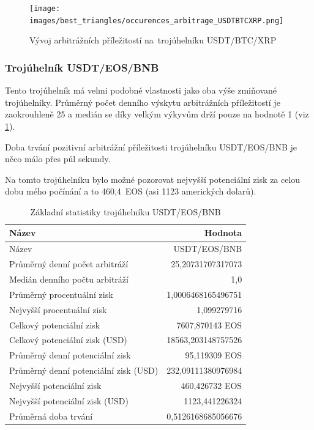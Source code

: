 \documentclass[thesis=B,czech]{FITthesis}[2019/03/21]
\begin{document}
\begin{figure}\centering
	\texttt{[image: images/best\_triangles/occurences\_arbitrage\_USDTBTCXRP.png]}
	\caption{Vývoj arbitrážních příležitostí na~trojúhelníku USDT/BTC/XRP }\label{occurences_arbitrage_USDTBTCXRP}
\end{figure}

\subsubsection{Trojúhelník USDT/EOS/BNB}
Tento trojúhelník má velmi podobné vlastnosti jako oba výše zmiňované \linebreak trojúhelníky. Průměrný počet denního výskytu arbitrážních příležitostí je zaokrouhleně 25 a medián se díky velkým výkyvům drží pouze na hodnotě 1 (viz \ref{USDTEOSBNB_stats}).

Doba trvání pozitivní arbitrážní příležitosti trojúhelníku USDT/EOS/BNB je něco málo přes půl sekundy.

Na tomto trojúhelníku bylo možné pozorovat nejvyšší potenciální zisk za celou dobu mého počínání a to 460,4~EOS (asi 1123 amerických dolarů).

\begin{table}\centering
\caption{Základní statistiky trojúhelníku USDT/EOS/BNB}
\label{USDTEOSBNB_stats}
\begin{tabular}{|| l | r ||}
\hline Název & Hodnota \\ 
\hline\hline Název & USDT/EOS/BNB \\ 
\hline Průměrný denní počet arbitráží & 25,20731707317073 \\ 
\hline Medián denního počtu arbitráží & 1,0 \\ 
\hline Průměrný procentuální zisk & 1,0006468165496751 \\ 
\hline Nejvyšší procentuální zisk & 1,099279716 \\ 
\hline Celkový potenciální zisk & 7607,870143 EOS \\ 
\hline Celkový potenciální zisk (USD) & 18563,203148757526 \\ 
\hline Průměrný denní potenciální zisk & 95,119309 EOS \\ 
\hline Průměrný denní potenciální zisk (USD) & 232,09111380976984 \\ 
\hline Nejvyšší potenciální zisk & 460,426732 EOS \\ 
\hline Nejvyšší potenciální zisk (USD) & 1123,441226324 \\ 
\hline Průměrná doba trvání & 0,5126168685056676 \\ 
\hline
\end{tabular}
\end{table}
\end{document}

